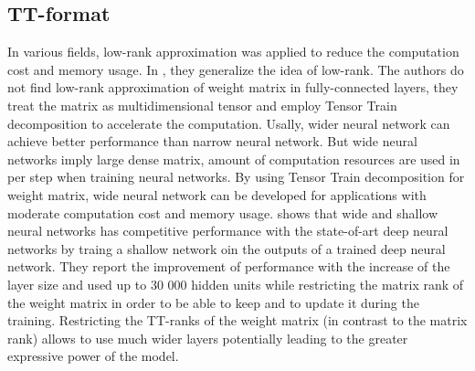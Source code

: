 \documentclass[onecolumn, conference]{IEEEtran}
\begin{document}
\subsection{TT-format}

In various fields, low-rank approximation was applied to reduce the computation cost and memory usage. In \cite{b11}, they generalize the idea of low-rank. The authors do not find low-rank approximation of weight matrix in fully-connected layers, they treat the matrix as multidimensional tensor and employ Tensor Train decomposition \cite{b6} to accelerate the computation.
Usally, wider neural network can achieve better performance than narrow neural network. But wide neural networks imply large dense matrix, amount of computation resources are used in per step when training neural networks. By using Tensor Train decomposition for weight matrix, wide neural network can be developed for applications with moderate computation cost and memory usage. 
\cite{b11} shows that wide and shallow neural networks has competitive performance with the state-of-art deep neural networks by traing a shallow network oin the outputs of a trained deep neural network.
They report the improvement of performance with the increase of the layer size and used up to 30 000 hidden units while restricting the matrix rank of the weight matrix in order to be able to keep and to update it during the training. Restricting the TT-ranks of the weight matrix (in contrast to the matrix rank) allows to use much wider layers potentially leading to the greater expressive power of the model.
\end{document}
